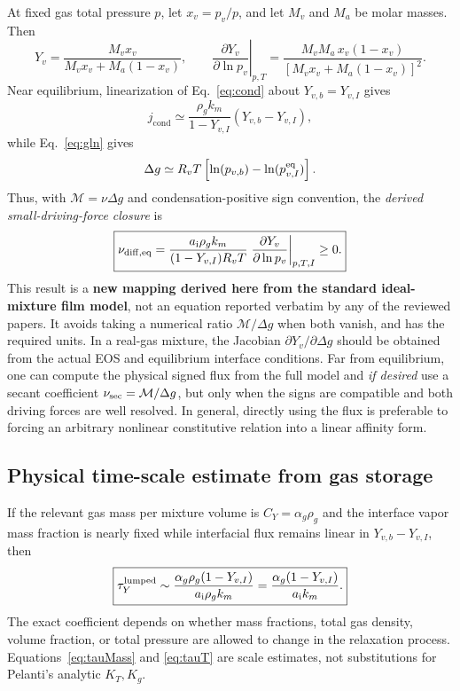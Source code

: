 \documentclass[11pt,letterpaper]{article}
\newcommand{\mi}{\mathrm{i}}
\newcommand{\area}{a_\mi}
\newcommand{\jcond}{j_{\mathrm{cond}}}
\newcommand{\mcal}{\mathcal{M}}
\begin{document}
At fixed gas total pressure $p$, let $x_v=p_v/p$, and let $M_v$ and $M_a$ be molar masses. Then
\begin{equation}\label{eq:Yx}
Y_v=\frac{M_v x_v}{M_vx_v+M_a(1-x_v)},\qquad
\left.\frac{\partial Y_v}{\partial\ln p_v}\right|_{p,T}
=\frac{M_vM_a\,x_v(1-x_v)}{[M_vx_v+M_a(1-x_v)]^2}.
\end{equation}
Near equilibrium, linearization of Eq.~\eqref{eq:cond} about $Y_{v,b}=Y_{v,I}$ gives
\begin{equation}
\jcond\simeq\frac{\rho_g k_m}{1-Y_{v,I}}(Y_{v,b}-Y_{v,I}),
\end{equation}
while Eq.~\eqref{eq:gln} gives
\begin{equation}
\Delta g\simeq R_vT\left[\ln(p_{v,b})-\ln(p_{v,I}^{\rm eq})\right].
\end{equation}
Thus, with $\mcal=\nu\Delta g$ and condensation-positive sign convention, the \emph{derived small-driving-force closure} is
\begin{equation}\label{eq:nu}
\boxed{\nu_{\rm diff,eq}=\frac{\area\rho_g k_m}{(1-Y_{v,I})R_vT}
\left.\frac{\partial Y_v}{\partial\ln p_v}\right|_{p,T,I}\ge0.}
\end{equation}
This result is a \textbf{new mapping derived here from the standard ideal-mixture film model}, not an equation reported verbatim by any of the reviewed papers. It avoids taking a numerical ratio $\mcal/\Delta g$ when both vanish, and has the required units. In a real-gas mixture, the Jacobian $\partial Y_v/\partial\Delta g$ should be obtained from the actual EOS and equilibrium interface conditions. Far from equilibrium, one can compute the physical signed flux from the full model and \emph{if desired} use a secant coefficient $\nu_{\rm sec}=\mcal/\Delta g$, but only when the signs are compatible and both driving forces are well resolved. In general, directly using the flux is preferable to forcing an arbitrary nonlinear constitutive relation into a linear affinity form.

\subsection{Physical time-scale estimate from gas storage}
If the relevant gas mass per mixture volume is $C_{Y}=\alpha_g\rho_g$ and the interface vapor mass fraction is nearly fixed while interfacial flux remains linear in $Y_{v,b}-Y_{v,I}$, then
\begin{equation}\label{eq:tauMass}
\boxed{\tau_{Y}^{\rm lumped}\sim\frac{\alpha_g\rho_g(1-Y_{v,I})}{\area\rho_g k_m}
=\frac{\alpha_g(1-Y_{v,I})}{\area k_m}.}
\end{equation}
The exact coefficient depends on whether mass fractions, total gas density, volume fraction, or total pressure are allowed to change in the relaxation process. Equations~\eqref{eq:tauMass} and \eqref{eq:tauT} are scale estimates, not substitutions for Pelanti's analytic $K_T,K_g$.
\end{document}
